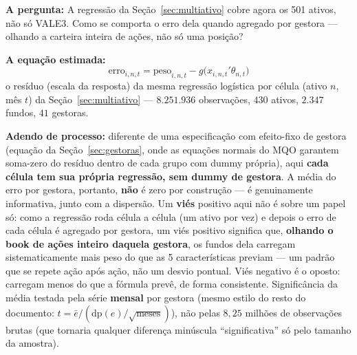 \documentclass[11pt,a4paper]{article}
\newcommand{\pergunta}[1]{\par\vspace{4pt}\noindent\textbf{\color{azul}A pergunta:} #1\par\vspace{2pt}}
\newcommand{\equacao}[0]{\par\vspace{4pt}\noindent\textbf{\color{vermelho}A equação estimada:}\ }
\begin{document}
\pergunta{A regressão da Seção~\ref{sec:multiativo} cobre agora os 501 ativos, não só VALE3.
Como se comporta o erro dela quando agregado por gestora --- olhando a carteira inteira de ações,
não só uma posição?}

\equacao
$$\text{erro}_{i,n,t} = \text{peso}_{i,n,t} - g\big(x_{i,n,t}'\theta_{n,t}\big)$$
o resíduo (escala da resposta) da mesma regressão logística por célula (ativo $n$, mês $t$) da
Seção~\ref{sec:multiativo} --- $8.251.936$ observações, $430$ ativos, $2.347$ fundos, $41$
gestoras.

\textbf{Adendo de processo:} diferente de uma especificação com efeito-fixo de gestora (equação
da Seção~\ref{sec:gestoras}, onde as equações normais do MQO garantem soma-zero do resíduo dentro
de cada grupo com dummy própria), aqui \textbf{cada célula tem sua própria regressão, sem dummy
de gestora}. A
média do erro por gestora, portanto, \textbf{não} é zero por construção --- é genuinamente
informativa, junto com a dispersão. Um \textbf{viés} positivo aqui não é sobre um papel só: como
a regressão roda célula a célula (um ativo por vez) e depois o erro de cada célula é agregado por
gestora, um viés positivo significa que, \textbf{olhando o book de ações inteiro daquela
gestora}, os fundos dela carregam sistematicamente mais peso do que as 5 características previam
--- um padrão que se repete ação após ação, não um desvio pontual. Viés negativo é o oposto:
carregam menos do que a fórmula prevê, de forma consistente. Significância da média testada pela
série \textbf{mensal} por gestora (mesmo estilo do resto do documento:
$t=\bar e/(\text{dp}(e)/\sqrt{\text{meses}})$), não pelas $8,25$ milhões de observações brutas
(que tornaria qualquer diferença minúscula
``significativa'' só pelo tamanho da amostra).
\end{document}
